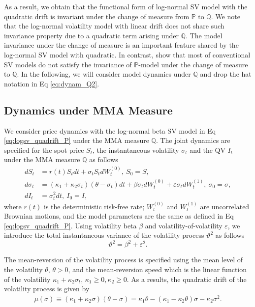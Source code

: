 \documentclass[11pt,a4paper] {article}
\begin{document}
As a result, we obtain that the functional form of log-normal SV model with the quadratic drift is invariant under the change of measure from $\mathbb{P}$ to $\mathbb{Q}$. We note that the log-normal volatility model with linear drift does not share such invariance property due to a quadratic term arising under $\mathbb{Q}$. The model invariance under the change of measure is an important feature shared by the log-normal SV model with quadratic. In contrast, \cite{SeppRakhmonov2023} show that most of conventional SV models do not satisfy the invariance of $\mathbb{P}$-model under the change of measure to $\mathbb{Q}$. In the following, we will consider model dynamics under $\mathbb{Q}$ and drop the hat notation in Eq \eqref{eq:dynam_Q2}.



\subsection{Dynamics under MMA Measure}

We consider price dynamics with the log-normal beta SV model in Eq \eqref{eq:logsv_quadrift_P} under the MMA measure $\mathbb{Q}$. The joint dynamics are specified for the spot price $S_{t}$, the instantaneous volatility $\sigma_{t}$ and the QV $I_{t}$ under the MMA measure $\mathbb{Q}$ as follows
\begin{equation} \label{eq:svmd1}
\begin{split}
dS_{t}&=r(t)S_{t}dt+\sigma_{t}S_{t}dW^{(0)}_{t}, \ S_{0} =S, \\
d\sigma_{t}& =\left(\kappa_{1} + \kappa_{2}\sigma_{t} \right)(\theta - \sigma_{t})dt+  \beta  \sigma_{t}dW^{(0)}_{t} +  \varepsilon \sigma_{t} dW^{(1)}_{t}, \ \sigma_{0}=\sigma, \\
dI_{t}&=\sigma^{2}_{t}dt, \ I_{0}=I,
\end{split}
\end{equation}
where $r(t)$ is the deterministic risk-free rate; $W^{(0)}_{t}$ and $W^{(1)}_t$  are uncorrelated Brownian motions, and the model parameters are the same as defined in Eq \eqref{eq:logsv_quadrift_P}. Using volatility beta $\beta$ and volatility-of-volatility $\varepsilon$, we introduce the total instantaneous variance of the volatility process $\vartheta^{2}$ as follows
\begin{equation}\label{eq:vartheta}
 \vartheta^{2}=\beta^{2}+\varepsilon^{2}.
\end{equation}

The mean-reversion of the volatility process is specified using the mean level of the volatility $\theta$, $\theta>0$, and the mean-reversion speed which is the linear function of the volatility $\kappa_{1} + \kappa_{2}\sigma_{t} $,  $\kappa_{1} \geq 0, \kappa_{2} \geq 0$. As a results, the quadratic drift of the volatility process is given by
\begin{equation}\label{eq:tr1}
\begin{split}
\mu\left(\sigma\right) \equiv \left(\kappa_{1} + \kappa_{2}\sigma\right)(\theta - \sigma) =\kappa_{1} \theta - \left(\kappa_{1} - \kappa_{2}\theta \right)\sigma- \kappa_{2}\sigma^{2}.
\end{split}
\end{equation}
\end{document}
